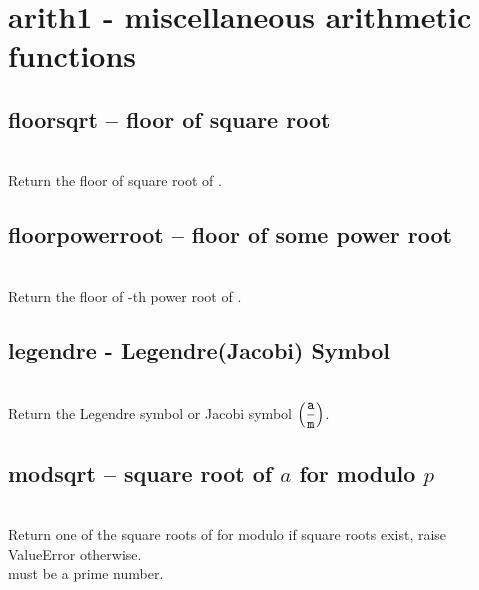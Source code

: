 

\section{arith1 - miscellaneous arithmetic functions}

\subsection{floorsqrt -- floor of square root}
\\
\spacing
\quad Return the floor of square root of .\\ 
%
\subsection{floorpowerroot -- floor of some power root}
\\
\spacing
\quad Return the floor of -th power root of .\\
%
\subsection{legendre - Legendre(Jacobi) Symbol}
\\
\spacing
\quad Return the Legendre symbol or Jacobi symbol $\displaystyle \Bigl(\frac{{\texttt a}}{{\texttt m}}\Bigr)$.\\
%
\subsection{modsqrt -- square root of $a$ for modulo $p$}
\\
\spacing
\quad Return one of the square roots of  for modulo  if square roots exist, raise ValueError otherwise.\\
\spacing
\quad {} must be a prime number.\\
%
